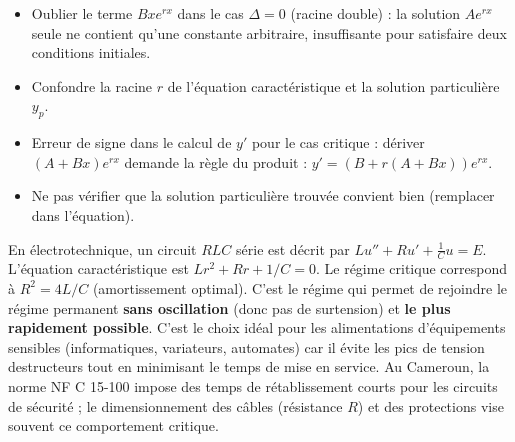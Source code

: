\documentclass[11pt]{article}
\begin{document}
\begin{attention}
\begin{itemize}
    \item Oublier le terme $B x e^{rx}$ dans le cas $\Delta = 0$ (racine double) : la solution $A e^{rx}$ seule ne contient qu'une constante arbitraire, insuffisante pour satisfaire deux conditions initiales.
    \item Confondre la racine $r$ de l'équation caractéristique et la solution particulière $y_p$.
    \item Erreur de signe dans le calcul de $y'$ pour le cas critique : dériver $(A+Bx)e^{rx}$ demande la règle du produit : $y' = (B + r(A+Bx))e^{rx}$.
    \item Ne pas vérifier que la solution particulière trouvée convient bien (remplacer dans l'équation).
\end{itemize}
\end{attention}

\begin{savaistu}
En électrotechnique, un circuit $RLC$ série est décrit par $L u'' + R u' + \frac{1}{C}u = E$. L'équation caractéristique est $L r^2 + R r + 1/C = 0$.
Le régime critique correspond à $R^2 = 4L/C$ (amortissement optimal). C'est le régime qui permet de rejoindre le régime permanent \textbf{sans oscillation} (donc pas de surtension) et \textbf{le plus rapidement possible}. C'est le choix idéal pour les alimentations d'équipements sensibles (informatiques, variateurs, automates) car il évite les pics de tension destructeurs tout en minimisant le temps de mise en service. Au Cameroun, la norme NF C 15-100 impose des temps de rétablissement courts pour les circuits de sécurité ; le dimensionnement des câbles (résistance $R$) et des protections vise souvent ce comportement critique.
\end{savaistu}
\end{document}
